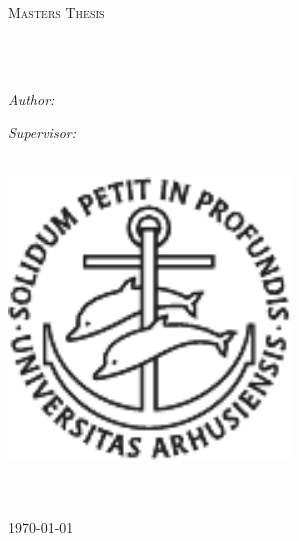 \begin{titlepage}
\begin{center}

\vspace*{.02\textheight}
{\scshape\LARGE \univname\par}\vspace{0.8cm} %
\textsc{\Large Masters Thesis}\\[0.4cm] %

\HRule \\[0.4cm] %
{\huge \bfseries \ttitle\par}\vspace{0.4cm} %
\HRule \\[0.9cm] %
 
\begin{minipage}[t]{0.4\textwidth}
\begin{flushleft} \large
\emph{Author:}\\
{\authorname} %
\end{flushleft}
\end{minipage}
\begin{minipage}[t]{0.4\textwidth}
\begin{flushright} \large
\emph{Supervisor:} \\
{\supname} %
\end{flushright}
\end{minipage}\\[1.3cm]
 
\includegraphics[width=7.5cm]{Figures/logo.pdf}\\[1.0cm]

\groupname\\\deptname\\[1.5cm] %
 
\vfill

{\large \today} %
 
\vfill
\end{center}
\end{titlepage}